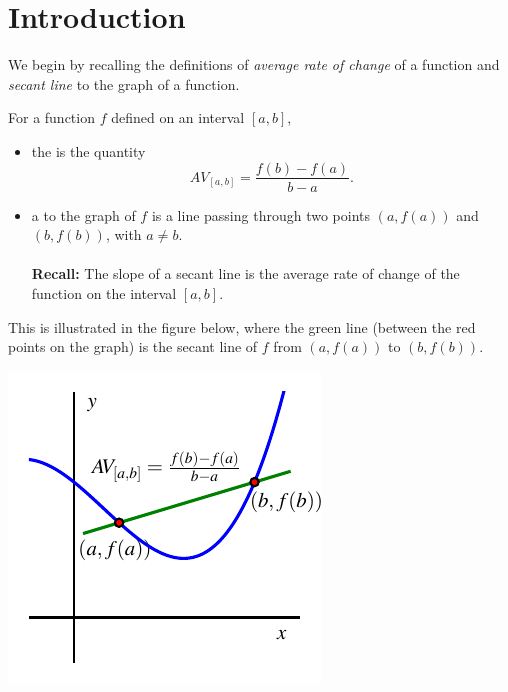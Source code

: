 \documentclass{ximera}
\begin{document}
\section{Introduction}
%
We begin by recalling the definitions of \textit{average rate of change} of a function and {\it secant line} to the graph of a function. 
\begin{definition}
For a function $f$ defined on an interval $[a,b]$, 
\begin{itemize}
\item the  is the quantity%
\begin{equation*}
AV_{[a,b]} = \frac{f(b) - f(a)}{b-a}\text{.}
\end{equation*}

\item a  to the graph of $f$ is a line passing through two points $(a,f(a))$ and $(b,f(b))$, with $a \neq b$. \\
\\
  {\bf Recall:} The slope of a secant line is the average rate of change of the function on the interval $[a,b]$.
\end{itemize}

This is illustrated in the figure below, where the green line (between the red points on the graph) is the secant line of $f$ from $(a,f(a))$ to $(b,f(b))$.

\begin{image}
\includegraphics{aroc-f-x-defn.pdf}
\end{image}

\end{definition}
\end{document}

